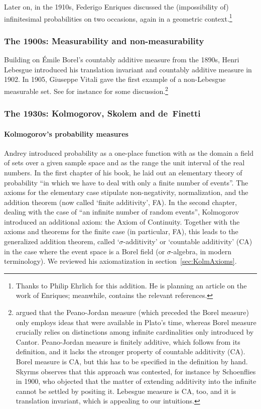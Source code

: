 Later on, in the 1910s, Federigo Enriques discussed the (impossibility of) infinitesimal probabilities on two occasions, again in a geometric context.\footnote{Thanks to Philip Ehrlich for this addition. He is planning an article on the work of Enriques; meanwhile, \citet{Ehrlich:2006} contains the relevant references.}

\subsubsection{The 1900s: Measurability and non-measurability}
Building on {\'E}mile Borel's countably additive measure from the 1890s, Henri Lebesgue introduced his translation invariant and countably additive measure in 1902. In 1905, Giuseppe Vitali gave the first example of a non-Lebesgue measurable set. See for instance \citet{Skyrms:1983a} for some discussion.\footnote{\citet{Skyrms:1983a} argued that the Peano-Jordan measure (which preceded the Borel measure) only employs ideas that were available in Plato's time, whereas Borel measure crucially relies on distinctions among infinite cardinalities only introduced by Cantor. Peano-Jordan measure is finitely additive, which follows from its definition, and it lacks the stronger property of countable additivity (CA). Borel measure is CA, but this has to be specified in the definition by hand. Skyrms observes that this approach was contested, for instance by Schoenflies in 1900, who objected that the matter of extending additivity into the infinite cannot be settled by positing it. Lebesgue measure is CA, too, and it is translation invariant, which is appealing to our intuitions.\label{fn:Schoenflies}}

\subsubsection{The 1930s: Kolmogorov, Skolem and de~Finetti}

\paragraph{Kolmogorov's probability measures}\label{sec:Kolmogorov}
Andrey \citet{Kolmogorov:1933} introduced probability as a one-place function with as the domain a field of sets over a given sample space and as the range the unit interval of the real numbers. In the first chapter of his book, he laid out an elementary theory of probability ``in which we have to deal with only a finite number of events''. The axioms for the elementary case stipulate non-negativity, normalization, and the addition theorem (now called `finite additivity', FA).
In the second chapter, dealing with the case of ``an infinite number of random events'', Kolmogorov introduced an additional axiom: the Axiom of Continuity. Together with the axioms and theorems for the finite case (in particular, FA), this leads to the generalized addition theorem, called `$\sigma $-additivity' or `countable additivity' (CA) in the case where the event space is a Borel field (or $\sigma $-algebra, in modern terminology). We reviewed his axiomatization in section~\ref{sec:KolmAxioms}.

